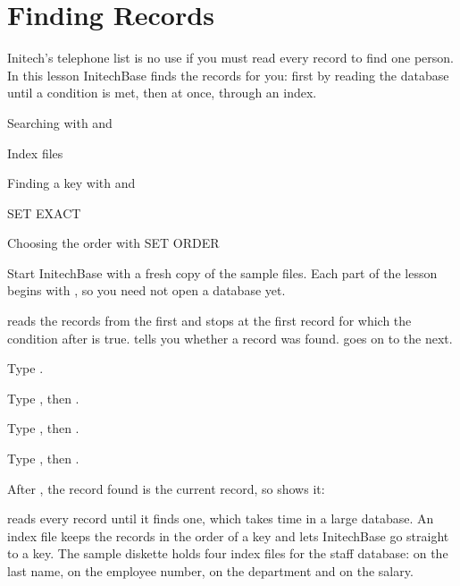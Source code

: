 \chapter{Finding Records}
Initech's telephone list is no use if you must read every record to find one
person.  In this lesson InitechBase finds the records for you: first by
reading the database until a condition is met, then at once, through an
index.

\begin{ChapterCovers}
\item Searching with  and 
\item {}
\item Index files
\item Finding a key with  and 
\item SET EXACT
\item Choosing the order with SET ORDER
\end{ChapterCovers}

Start InitechBase with a fresh copy of the sample files.  Each part of the
lesson begins with , so you need not open a database yet.

 reads the records from the first and stops at the first record
for which the condition after  is true.   tells you
whether a record was found.   goes on to the next.
\begin{Steps}
\item Type .
\item Type , then .
\item Type , then .
\item Type , then .
\end{Steps}
After , the record found is the current record, so 
shows it:

 reads every record until it finds one, which takes time in a large
database.  An index file keeps the records in the order of a key and lets
InitechBase go straight to a key.  The sample diskette holds four index files
for the staff database:  on the last name,
 on the employee number,  on the
department and  on the salary.

